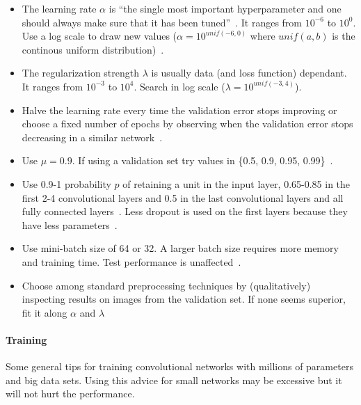 \begin{itemize}
	\item The learning rate $\alpha$ is ``the single most important hyperparameter and one should always make sure that it has been tuned''~\cite{Bengio2012}. It ranges from $10^{-6}$ to $10^{0}$. Use a log scale to draw new values ($\alpha = 10^{unif(-6, 0)}$ where $unif(a,b)$ is the continous uniform distribution)~\cite{Karpathy2015}.

	\item The regularization strength $\lambda$ is usually data (and loss function) dependant. It ranges from $10^{-3}$ to $10^4$. Search in log scale ($\lambda = 10^{unif(-3, 4)}$).
	\item Halve the learning rate every time the validation error stops improving or choose a fixed number of epochs by observing when the validation error stops decreasing in a similar network~\cite{Krizhevsky2012}.

	\item Use $\mu=0.9$. If using a validation set try values in \{0.5, 0.9, 0.95, 0.99\}~\cite{Karpathy2015}.

	\item Use 0.9-1 probability $p$ of retaining a unit in the input layer, 0.65-0.85 in the first 2-4 convolutional layers and 0.5 in the last convolutional layers and all fully connected layers~\cite{Srivastava2014}. Less dropout is used on the first layers because they have less parameters~\cite{Karpathy2015}.

	\item Use mini-batch size of 64 or 32. A larger batch size requires more memory and training time. Test performance is unaffected~\cite{Bengio2012}.

	\item Choose among standard preprocessing techniques by (qualitatively) inspecting results on images from the validation set. If none seems superior, fit it along $\alpha$ and $\lambda$%
\end{itemize}



\paragraph{Training}
Some general tips for training convolutional networks with millions of parameters and big data sets. Using this advice for small networks may be excessive but it will not hurt the performance.

